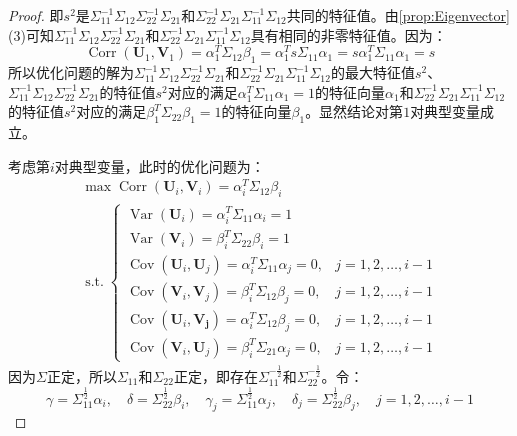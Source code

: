 \begin{proof}
	即$s^2$是$\Sigma_{11}^{-1}\Sigma_{12}\Sigma_{22}^{-1}\Sigma_{21}$和$\Sigma_{22}^{-1}\Sigma_{21}\Sigma_{11}^{-1}\Sigma_{12}$共同的特征值。由\cref{prop:Eigenvector}(3)可知$\Sigma_{11}^{-1}\Sigma_{12}\Sigma_{22}^{-1}\Sigma_{21}$和$\Sigma_{22}^{-1}\Sigma_{21}\Sigma_{11}^{-1}\Sigma_{12}$具有相同的非零特征值。因为：
	\begin{equation*}
		\operatorname{Corr}(\mathbf{U}_1,\mathbf{V}_1)=\alpha_1^T\Sigma_{12}\beta_1=\alpha_1^Ts\Sigma_{11}\alpha_1=s\alpha_1^T\Sigma_{11}\alpha_1=s
	\end{equation*}
	所以优化问题的解为$\Sigma_{11}^{-1}\Sigma_{12}\Sigma_{22}^{-1}\Sigma_{21}$和$\Sigma_{22}^{-1}\Sigma_{21}\Sigma_{11}^{-1}\Sigma_{12}$的最大特征值$s^2$、$\Sigma_{11}^{-1}\Sigma_{12}\Sigma_{22}^{-1}\Sigma_{21}$的特征值$s^2$对应的满足$\alpha_1^T\Sigma_{11}\alpha_1=1$的特征向量$\alpha_1$和$\Sigma_{22}^{-1}\Sigma_{21}\Sigma_{11}^{-1}\Sigma_{12}$的特征值$s^2$对应的满足$\beta_1^T\Sigma_{22}\beta_1=1$的特征向量$\beta_1$。显然结论对第$1$对典型变量成立。\par
	考虑第$i$对典型变量，此时的优化问题为：
	\begin{gather*}
		\max\operatorname{Corr}(\mathbf{U}_i,\mathbf{V}_i)=\alpha_i^T\Sigma_{12}\beta_i \\
		\operatorname{s.t.}
		\begin{cases}
			\operatorname{Var}(\mathbf{U}_i)=\alpha_i^T\Sigma_{11}\alpha_i=1 \\
			\operatorname{Var}(\mathbf{V}_i)=\beta_i^T\Sigma_{22}\beta_i=1 \\
			\operatorname{Cov}(\mathbf{U}_i,\mathbf{U}_j)=\alpha_i^T\Sigma_{11}\alpha_j=0,&j=1,2,\dots,i-1 \\
			\operatorname{Cov}(\mathbf{V}_i,\mathbf{V}_j)=\beta_i^T\Sigma_{12}\beta_j=0,&j=1,2,\dots,i-1 \\
			\operatorname{Cov}(\mathbf{U}_i,\mathbf{V_j})=\alpha_i^T\Sigma_{12}\beta_j=0,&j=1,2,\dots,i-1 \\
			\operatorname{Cov}(\mathbf{V}_i,\mathbf{U}_j)=\beta_i^T\Sigma_{21}\alpha_j=0,&j=1,2,\dots,i-1
		\end{cases}
	\end{gather*}
	因为$\Sigma$正定，所以$\Sigma_{11}$和$\Sigma_{22}$正定，即存在$\Sigma_{11}^{-\frac{1}{2}}$和$\Sigma_{22}^{-\frac{1}{2}}$。令：
	\begin{equation*}
		\gamma=\Sigma_{11}^{\frac{1}{2}}\alpha_i,\quad\delta=\Sigma_{22}^{\frac{1}{2}}\beta_i,\quad\gamma_j=\Sigma_{11}^{\frac{1}{2}}\alpha_j,\quad\delta_j=\Sigma_{22}^{\frac{1}{2}}\beta_j,\quad j=1,2,\dots,i-1

\end{equation*}
\end{proof}
